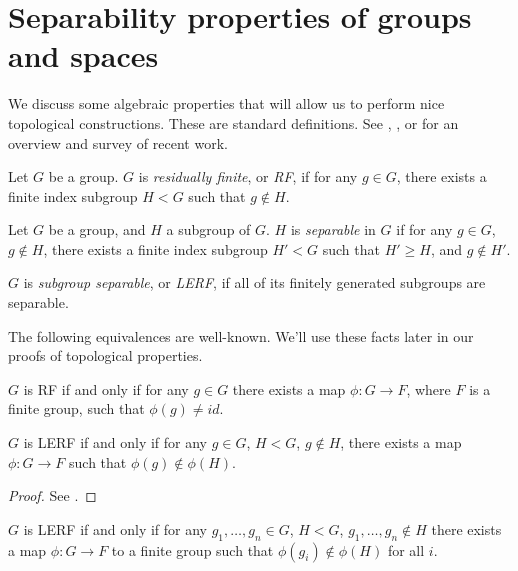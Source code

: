 \section{Separability properties of groups and spaces}

We discuss some algebraic properties that will allow us to perform nice
topological constructions. These are standard definitions. See
\cite{Agolsurvey}, \cite{LR}, or \cite{AFW} for an overview and survey of
recent work.

\begin{defn}

Let $G$ be a group. $G$ is \emph{residually finite}, or \emph{RF}, if for any
$g \in G$, there exists a finite index subgroup $H<G$ such that $g \notin H$.

Let $G$ be a group, and $H$ a subgroup of $G$. $H$ is \emph{separable} in $G$
if for any $g \in G$, $g \notin H$, there exists a finite index subgroup $H'<G$
such that $H' \geq H$, and $g \notin H'$.

$G$ is \emph{subgroup separable}, or \emph{LERF}, if all of its finitely
generated subgroups are separable.

\end{defn}

The following equivalences are well-known.  We'll use these facts later in our
proofs of topological properties.

\begin{prop}\label{P:lerfmap}

$G$ is RF if and only if for any $g \in G$ there exists a map $\phi \colon
G \to F$, where $F$ is a finite group, such that $\phi(g) \neq id$.

$G$ is LERF if and only if for any $g \in G$, $H < G$, $g \notin H$, there
exists a map $\phi \colon G \to F$ such that $\phi(g) \notin \phi(H)$.

\end{prop}

\begin{proof}

See \cite{LR}.

\end{proof}

\begin{cor}\label{C:lerfmap'}

$G$ is LERF if and only if for any $g_1,\dots,g_n \in G$, $H<G$, $g_1,\dots,g_n
\notin H$ there exists a map $\phi \colon G \to F$ to a finite group such that
$\phi(g_i) \notin \phi(H)$ for all $i$.

\end{cor}


